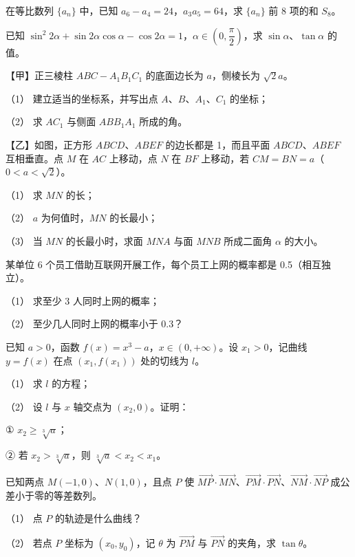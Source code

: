 \begin{question}
在等比数列 $\{a_n\}$ 中，已知 $a_6-a_4=24$，$a_3a_5=64$，求 $\{a_n\}$ 前 8 项的和 $S_8$。

\end{question}
\begin{question}
已知 $\sin^2 2\alpha+\sin2\alpha\cos\alpha-\cos2\alpha=1$，$\alpha\in\left(0,\dfrac\pi2\right)$，求 $\sin\alpha\text{、}\tan\alpha$ 的值。

\Needspace{0.4\textheight}
\end{question}
\begin{question}
【甲】正三棱柱 $ABC-A_1B_1C_1$ 的底面边长为 $a$，侧棱长为 $\sqrt2a$。
\nopagebreak[4]
\begin{center}\end{center}
\nopagebreak[4]
（1） 建立适当的坐标系，并写出点 $A\text{、}B\text{、}A_1\text{、}C_1$ 的坐标；

（2） 求 $AC_1$ 与侧面 $ABB_1A_1$ 所成的角。

【乙】如图，正方形 $ABCD\text{、}ABEF$ 的边长都是 1，而且平面 $ABCD\text{、}ABEF$ 互相垂直。点 $M$ 在 $AC$ 上移动，点 $N$ 在 $BF$ 上移动，若 $CM=BN=a$（$0<a<\sqrt2$）。
\nopagebreak[4]
\begin{center}\end{center}
\nopagebreak[4]
（1） 求 $MN$ 的长；

（2） $a$ 为何值时，$MN$ 的长最小；

（3） 当 $MN$ 的长最小时，求面 $MNA$ 与面 $MNB$ 所成二面角 $\alpha$ 的大小。

\end{question}
\begin{question}
某单位 6 个员工借助互联网开展工作，每个员工上网的概率都是 0.5（相互独立）。

（1） 求至少 3 人同时上网的概率；

（2） 至少几人同时上网的概率小于 0.3？

\end{question}
\begin{question}
已知 $a>0$，函数 $f(x)=x^3-a$，$x\in(0,+\infty)$。设 $x_1>0$，记曲线 $y=f(x)$ 在点 $(x_1,f(x_1))$ 处的切线为 $l$。

（1） 求 $l$ 的方程；

（2） 设 $l$ 与 $x$ 轴交点为 $(x_2,0)$。证明：

① $x_2\geqslant\sqrt[3]{a}$；

② 若 $x_2>\sqrt[3]{a}$，则 $\sqrt[3]{a}<x_2<x_1$。

\end{question}
\begin{question}
已知两点 $M(-1,0)\text{、}N(1,0)$，且点 $P$ 使 $\overrightarrow{MP}\cdot\overrightarrow{MN}$、$\overrightarrow{PM}\cdot\overrightarrow{PN}$、$\overrightarrow{NM}\cdot\overrightarrow{NP}$ 成公差小于零的等差数列。

（1） 点 $P$ 的轨迹是什么曲线？

（2） 若点 $P$ 坐标为 $(x_0,y_0)$，记 $\theta$ 为 $\overrightarrow{PM}$ 与 $\overrightarrow{PN}$ 的夹角，求 $\tan\theta$。

\end{question}